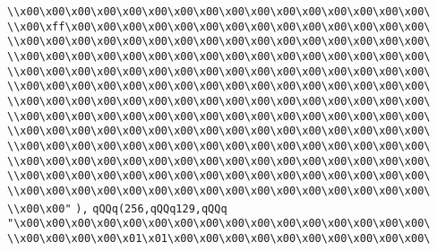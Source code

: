 \verb|\\x00\x00\x00\x00\x00\x00\x00\x00\x00\x00\x00\x00\x00\x00\x00\x00\|\newline
\verb|\\x00\xff\x00\x00\x00\x00\x00\x00\x00\x00\x00\x00\x00\x00\x00\x00\|\newline
\verb|\\x00\x00\x00\x00\x00\x00\x00\x00\x00\x00\x00\x00\x00\x00\x00\x00\|\newline
\verb|\\x00\x00\x00\x00\x00\x00\x00\x00\x00\x00\x00\x00\x00\x00\x00\x00\|\newline
\verb|\\x00\x00\x00\x00\x00\x00\x00\x00\x00\x00\x00\x00\x00\x00\x00\x00\|\newline
\verb|\\x00\x00\x00\x00\x00\x00\x00\x00\x00\x00\x00\x00\x00\x00\x00\x00\|\newline
\verb|\\x00\x00\x00\x00\x00\x00\x00\x00\x00\x00\x00\x00\x00\x00\x00\x00\|\newline
\verb|\\x00\x00\x00\x00\x00\x00\x00\x00\x00\x00\x00\x00\x00\x00\x00\x00\|\newline
\verb|\\x00\x00\x00\x00\x00\x00\x00\x00\x00\x00\x00\x00\x00\x00\x00\x00\|\newline
\verb|\\x00\x00\x00\x00\x00\x00\x00\x00\x00\x00\x00\x00\x00\x00\x00\x00\|\newline
\verb|\\x00\x00\x00\x00\x00\x00\x00\x00\x00\x00\x00\x00\x00\x00\x00\x00\|\newline
\verb|\\x00\x00\x00\x00\x00\x00\x00\x00\x00\x00\x00\x00\x00\x00\x00\x00\|\newline
\verb|\\x00\x00\x00\x00\x00\x00\x00\x00\x00\x00\x00\x00\x00\x00\x00\x00\|\newline
\verb|\\x00\x00"|\newline
\verb|),|\newline
\verb|qQQq(256,qQQq129,qQQq|\newline
\verb|"\x00\x00\x00\x00\x00\x00\x00\x00\x00\x00\x00\x00\x00\x00\x00\x00\|\newline
\verb|\\x00\x00\x00\x00\x01\x01\x00\x00\x00\x00\x00\x00\x00\x00\x00\x00\|\newline

